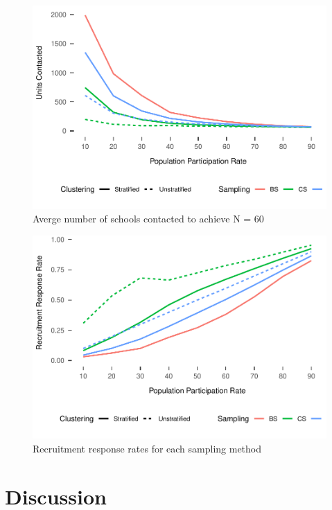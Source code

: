 \documentclass[man,floatsintext]{apa6}
\theoremstyle{definition}
\theoremstyle{definition}
\theoremstyle{definition}
\theoremstyle{remark}
\begin{document}
\begin{figure}
\centering
\includegraphics{GenSamp_Paper_files/figure-latex/fig-units-contacted-1.pdf}
\caption{\label{fig:fig-units-contacted}Averge number of schools contacted
to achieve N = 60}
\end{figure}

\begin{figure}
\centering
\includegraphics{GenSamp_Paper_files/figure-latex/fig-response-rates-1.pdf}
\caption{\label{fig:fig-response-rates}Recruitment response rates for each
sampling method}
\end{figure}

\newpage

\hypertarget{discussion}{%
\section{Discussion}\label{discussion}}
\end{document}

